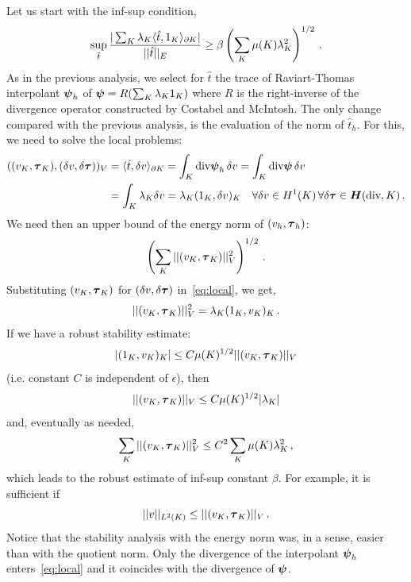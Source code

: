 \documentclass[Proposal.tex]{subfiles}
\begin{document}
Let us start with the inf-sup condition,
\begin{equation}
\sup_{\hat{t}} \frac{| \sum_K \lambda_K \langle \hat{t},1_K \rangle_{\partial K} |}{|| \hat{t} ||_E}
\geq  \beta \left( \sum_K \mu(K) \lambda_K^2 \right)^{1/2}\,.
\end{equation}
As in the previous analysis, we select for $\hat{t}$ the trace of Raviart-Thomas
interpolant $\boldsymbol\psi_h$ of $\boldsymbol\psi = R (\sum_K \lambda_K 1_K)$ where $R$ is the right-inverse
of the divergence operator constructed by Costabel and McIntosh. The only change compared
with the previous analysis, is the evaluation of the norm of $\hat{t}_h$. For this, we need
to solve the local problems:
\begin{align}
((v_K,\boldsymbol\tau_K), (\delta v, \delta \boldsymbol\tau))_V &= \langle \hat{t}, \delta v \rangle_{\partial K}
= \int_K \text{div} \boldsymbol\psi_h \, \delta v = \int_K \text{div} \boldsymbol\psi \, \delta v
\nonumber\\
&= \int_K \lambda_K \delta v
= \lambda_K (1_K,\delta v)_K  \quad \forall \delta v \in
H^1(K)\,\forall\delta\boldsymbol\tau\in\mbox{\boldmath $H$}(\text{div},K)\,.
\label{eq:local}
\end{align}
We need then an upper bound of the energy norm of $(v_h,\boldsymbol\tau_h)$:
$$
\left( \sum_K || (v_K,\boldsymbol\tau_K) ||_V^2 \right)^{1/2}\,.
$$
Substituting $(v_K,\boldsymbol\tau_K)$ for $(\delta v,\delta\boldsymbol\tau)$ in~\eqref{eq:local}, we get,
\begin{equation}
|| (v_K,\boldsymbol\tau_K) ||_V^2 = \lambda_K (1_K, v_K)_K\,.
\end{equation}
If we have a robust stability estimate:
\begin{equation}
|(1_K, v_K)_K| \leq C \mu(K)^{1/2} || (v_K,\boldsymbol\tau_K) ||_V
\label{eq:robustEst1}
\end{equation}
(i.e. constant $C$ is independent of $\epsilon$), then
\begin{equation}
||  (v_K,\boldsymbol\tau_K) ||_V \leq C \mu(K)^{1/2} | \lambda_K |
\end{equation}
and, eventually as needed,
\begin{equation}
\sum_K || (v_K,\boldsymbol\tau_K) ||_V^2  \leq C^2 \sum_K \mu(K) \lambda_K^2\,,
\end{equation}
which leads to the robust estimate of inf-sup constant $\beta$. For example, it is sufficient if
\begin{equation}
|| v ||_{L^2(K)} \leq || (v_K,\boldsymbol\tau_K) ||_V \, .
\label{eq:robust_est1}
\end{equation}
Notice that the stability analysis with the energy norm was, in a sense, easier than
with the quotient norm. Only the divergence of the interpolant $\boldsymbol\psi_h$
enters~\eqref{eq:local}
and it coincides with the divergence of $\boldsymbol\psi$.
\end{document}
